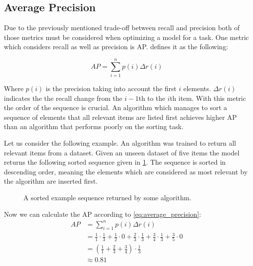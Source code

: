 \subsection{Average Precision}
\label{chp:fundamentals:sec:metrics:subsec:average_precision}

Due to the previously mentioned trade-off between recall and precision both of those metrics must be considered when optimizing a model for a task.
One metric which considers recall as well as precision is \ac{AP}.
\Textcite{Zhu:2004} defines it as the following:

\begin{equation}\label{eq:average_precision}
    AP = \sum_{i=1}^n {p(i)\Delta r(i)}
\end{equation}

Where $p(i)$ is the precision taking into account the first $i$ elements.
$\Delta r(i)$ indicates the the recall change from the $i-1$th to the $i$th item.
With this metric the order of the sequence is crucial.
An algorithm which manages to sort a sequence of elements that all relevant items are listed first achieves higher AP than an algorithm that performs poorly on the sorting task.

Let us consider the following example.
An algorithm was trained to return all relevant items from a dataset.
Given an unseen dataset of five items the model returns the following sorted sequence given in \cref{fig:metrics:average_precision:sample}.
The sequence is sorted in descending order, meaning the elements which are considered as most relevant by the algorithm are inserted first.

\begin{figure}[htpb]
    \centering
    \def\svgwidth{\columnwidth}
    
    \caption[Example Sequence]{A sorted example sequence returned by some algorithm.}\label{fig:metrics:average_precision:sample}
\end{figure}

Now we can calculate the \ac{AP} according to \cref{eq:average_precision}:
\begin{equation}
    \begin{aligned}
        AP &= \sum_{i=1}^n {p(i)\Delta r(i)}\\
        &= \frac{1}{1} \cdot \frac{1}{3} + \frac{1}{2} \cdot 0 + \frac{2}{3} \cdot \frac{1}{3} + \frac{3}{4} \cdot \frac{1}{3} + \frac{3}{5} \cdot 0\\
        &=  (\frac{1}{1} + \frac{2}{3}  + \frac{3}{4}) \cdot \frac{1}{3}\\
        &\approx 0.81
    \end{aligned}
\end{equation}
